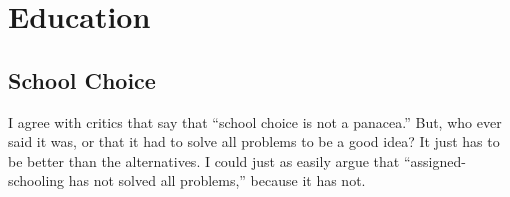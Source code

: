\chapter{Education}
\label{chpt:education}

\section{School Choice}

I agree with critics that say that ``school choice is not a panacea.'' But, who
ever said it was, or that it had to solve all problems to be a good idea? It
just has to be better than the alternatives. I could just as easily argue that
``assigned-schooling has not solved all problems,'' because it has not.

